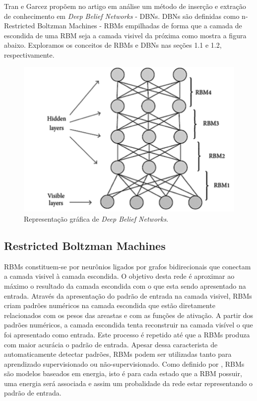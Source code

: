 \documentclass[a4paper, 12pt]{article}
\begin{document}
    Tran e Garcez\cite{Tran} propõem no artigo em análise um método de inserção e extração de conhecimento em \textit{Deep Belief Networks} - DBNs. DBNs são definidas como n-Restricted Boltzman Machines - RBMs empilhadas de forma que a camada de escondida de uma RBM seja a camada visivel da próxima como mostra a figura abaixo. Exploramos os conceitos de RBMs e DBNs nas seções 1.1 e 1.2, respectivamente.
    
    \begin{figure}[h]
     \centering
     \includegraphics[scale=0.3]{Graphical-Representation-of-a-Deep-Belief-Network.png}
     \caption{Representação gráfica de \textit{Deep Belief Networks}.\cite{imagem1}}
    \end{figure}
    
    \subsection{Restricted Boltzman Machines}
    RBMs constituem-se por neurônios ligados por grafos bidirecionais que conectam a camada visivel à camada escondida. O objetivo desta rede é aproximar ao máximo o resultado da camada escondida com o que esta sendo apresentado na entrada. Através da apresentação do padrão de entrada na camada visivel, RBMs criam padrões numéricos na camada escondida que estão diretamente relacionados com os pesos das areastas e com as funções de ativação. A partir dos padrões numéricos, a camada escondida tenta reconstruir na camada visível o que foi apresentado como entrada. Este processo é repetido até que a RBMs produza com maior acurácia o padrão de entrada. Apesar dessa caracterista de automaticamente detectar padrões, RBMs podem ser utilizadas tanto para aprendizado supervisionado ou não-supervisionado. Como definido por \cite{overviewRBM}, RBMs são modelos baseados em energia, isto é para cada estado que a RBM possuir, uma energia será associada e assim um probalidade da rede estar representando o padrão de entrada.
\end{document}
